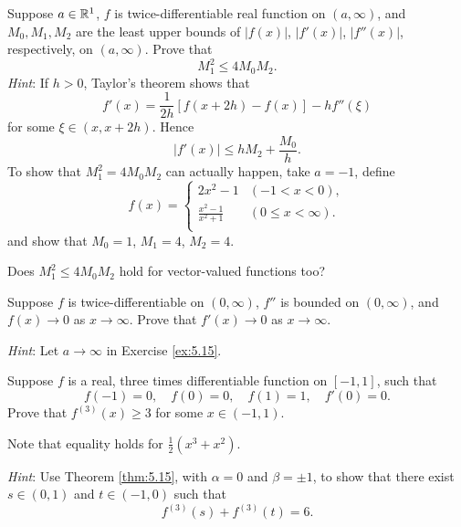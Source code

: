 \begin{myExercise}
    \label{ex:5.15}
    Suppose $a \in {\protect\mathbb R}^1$, $f$ is twice-differentiable real function on $(a, \infty)$, and $M_0, M_1, M_2$ are the least upper bounds of $|f(x)|$, $|f'(x)|$, $|f''(x)|$, respectively, on $(a, \infty)$.
    Prove that 
    \begin{equation*}
        M_1^2 \leq 4 M_0 M_2 .
    \end{equation*}
    \emph{Hint}: If $h>0$, Taylor's theorem shows that 
    \begin{equation*}
        f'(x) = \frac{1}{2h}\left[ f(x+2h) - f(x) \right] - h f''(\xi)
    \end{equation*}
    for some $\xi \in (x, x+2h)$.
    Hence
    \begin{equation*}
        \left| f'(x) \right| \leq h M_2 + \frac{M_0}{h}.
    \end{equation*}
    To show that $M_1^2 = 4M_0 M_2$ can actually happen,
    take $a = -1$, define 
    \begin{equation*}
        f(x) = \left\{ 
            \begin{array}{ll}
                2x^2-1 & (-1<x<0), \\
                \frac{x^2-1}{x^2+1} & (0\leq x < \infty). \\
            \end{array}
        \right.
    \end{equation*}
    and show that 
    $M_0 = 1$,
    $M_1 = 4$,
    $M_2 = 4$.
    
    Does $M_1^2 \leq 4 M_0 M_2$ hold for vector-valued functions too?
\end{myExercise}


\begin{myExercise}
    \label{ex:5.16}
    Suppose $f$ is twice-differentiable on $(0, \infty)$, 
    $f''$ is bounded on $(0, \infty)$, 
    and $f(x) \rightarrow 0$
    as $x \rightarrow \infty$. 
    Prove that $f'(x) \rightarrow 0$ 
    as $x \rightarrow \infty$.

    \emph{Hint}: Let $a \rightarrow \infty$ in Exercise \ref{ex:5.15}.
\end{myExercise}


\begin{myExercise}
    \label{ex:5.17}
    Suppose $f$ is a real, three times differentiable function on $[-1, 1]$, such that
    \begin{equation*}
        f(-1) =0,   \quad
        f(0) =0,    \quad
        f(1) = 1,   \quad
        f'(0) = 0.
    \end{equation*}
    Prove that $f^{(3)} (x) \geq 3$ for some $x \in (-1, 1)$. 

    Note that equality holds for $\frac{1}{2}(x^3 + x^2)$. 
    
    \emph{Hint}: Use Theorem \ref{thm:5.15}, 
    with $\alpha = 0$ and $\beta = \pm 1$, 
    to show that there exist $s \in (0, 1)$ and $t \in (-1, 0)$ 
    such that 
    \begin{equation*}
        f^{(3)}(s) + f^{(3)}(t) = 6.
    \end{equation*}
\end{myExercise}


